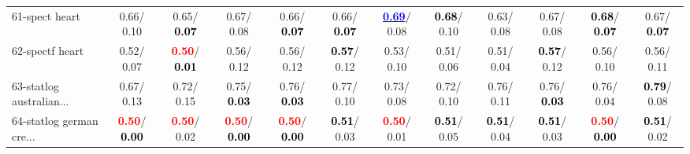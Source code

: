 \begin{table}[h]
\begin{center}
{\begin{tabular}{lc|c|c|c|c|c|c|c|c|c|c}
61-spect heart &   0.66/  0.10 &   0.65/\textcolor{black}{\textbf{  0.07}} &   0.67/  0.08 &   0.66/\textcolor{black}{\textbf{  0.07}} &   0.66/\textcolor{black}{\textbf{  0.07}} & \underline{\textcolor{blue}{\textbf{  0.69}}}/  0.08 & \textcolor{black}{\textbf{  0.68}}/  0.10 &   0.63/  0.08 &   0.67/  0.08 & \textcolor{black}{\textbf{  0.68}}/\textcolor{black}{\textbf{  0.07}} &   0.67/\textcolor{black}{\textbf{  0.07}} \\
62-spectf heart &   0.52/  0.07 & \textcolor{red}{\textbf{  0.50}}/\textcolor{black}{\textbf{  0.01}} &   0.56/  0.12 &   0.56/  0.12 & \textcolor{black}{\textbf{  0.57}}/  0.12 &   0.53/  0.10 &   0.51/  0.06 &   0.51/  0.04 & \textcolor{black}{\textbf{  0.57}}/  0.12 &   0.56/  0.10 &   0.56/  0.11 \\
63-statlog australian... &   0.67/  0.13 &   0.72/  0.15 &   0.75/\textcolor{black}{\textbf{  0.03}} &   0.76/\textcolor{black}{\textbf{  0.03}} &   0.77/  0.10 &   0.73/  0.08 &   0.72/  0.10 &   0.76/  0.11 &   0.76/\textcolor{black}{\textbf{  0.03}} &   0.76/  0.04 & \textcolor{black}{\textbf{  0.79}}/  0.08 \\
64-statlog german cre... & \textcolor{red}{\textbf{  0.50}}/\textcolor{black}{\textbf{  0.00}} & \textcolor{red}{\textbf{  0.50}}/  0.02 & \textcolor{red}{\textbf{  0.50}}/\textcolor{black}{\textbf{  0.00}} & \textcolor{red}{\textbf{  0.50}}/\textcolor{black}{\textbf{  0.00}} & \textcolor{black}{\textbf{  0.51}}/  0.03 & \textcolor{red}{\textbf{  0.50}}/  0.01 & \textcolor{black}{\textbf{  0.51}}/  0.05 & \textcolor{black}{\textbf{  0.51}}/  0.04 & \textcolor{black}{\textbf{  0.51}}/  0.03 & \textcolor{red}{\textbf{  0.50}}/\textcolor{black}{\textbf{  0.00}} & \textcolor{black}{\textbf{  0.51}}/  0.02 \\\end{tabular}}\label{stratsBalAcc1bVFDT}
\end{center}
\end{table}
